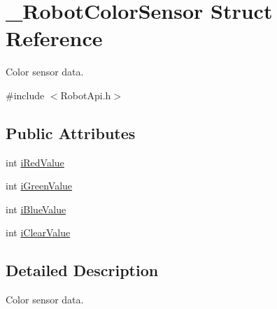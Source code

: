 \hypertarget{struct__RobotColorSensor}{\section{\-\_\-\-Robot\-Color\-Sensor Struct Reference}
\label{struct__RobotColorSensor}
}


Color sensor data.  




{\ttfamily \#include $<$Robot\-Api.\-h$>$}

\subsection*{Public Attributes}
\begin{DoxyCompactItemize}
\item 
int \hyperlink{struct__RobotColorSensor_a38b270be1ee87849b7469d100e335314}{i\-Red\-Value}
\item 
int \hyperlink{struct__RobotColorSensor_acfeb66d972f8c3ab2a5982fd4aa3f630}{i\-Green\-Value}
\item 
int \hyperlink{struct__RobotColorSensor_ad5c72e4e33a2447d6514d1d5a13dc036}{i\-Blue\-Value}
\item 
int \hyperlink{struct__RobotColorSensor_afc18a2ae43409d1b74340f6f9d9fb677}{i\-Clear\-Value}
\end{DoxyCompactItemize}


\subsection{Detailed Description}
Color sensor data. 

